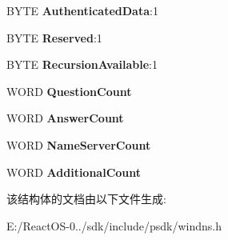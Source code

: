 \begin{DoxyCompactItemize}
\mbox{\label{struct___d_n_s___h_e_a_d_e_r_a081f5d4040744113990c791a153b8e29}} 
B\+Y\+TE {\bfseries Authenticated\+Data}\+:1
\item 
\mbox{\label{struct___d_n_s___h_e_a_d_e_r_a43e2cab707c0ff3caabdff06c6bef056}} 
B\+Y\+TE {\bfseries Reserved}\+:1
\item 
\mbox{\label{struct___d_n_s___h_e_a_d_e_r_ae46b8239560efa2aba996a045253cabc}} 
B\+Y\+TE {\bfseries Recursion\+Available}\+:1
\item 
\mbox{\label{struct___d_n_s___h_e_a_d_e_r_a201bc32d789c21d86ab24722611774a1}} 
W\+O\+RD {\bfseries Question\+Count}
\item 
\mbox{\label{struct___d_n_s___h_e_a_d_e_r_a7625354e87783168634ab1a171b46013}} 
W\+O\+RD {\bfseries Answer\+Count}
\item 
\mbox{\label{struct___d_n_s___h_e_a_d_e_r_ab2fa443dc9b225549f77eaacd7908d65}} 
W\+O\+RD {\bfseries Name\+Server\+Count}
\item 
\mbox{\label{struct___d_n_s___h_e_a_d_e_r_a075ca5905ff4c8e85f00da94c558bfd0}} 
W\+O\+RD {\bfseries Additional\+Count}
\end{DoxyCompactItemize}


该结构体的文档由以下文件生成\+:\begin{DoxyCompactItemize}
\item 
E\+:/\+React\+O\+S-\/0../sdk/include/psdk/windns.\+h\end{DoxyCompactItemize}
